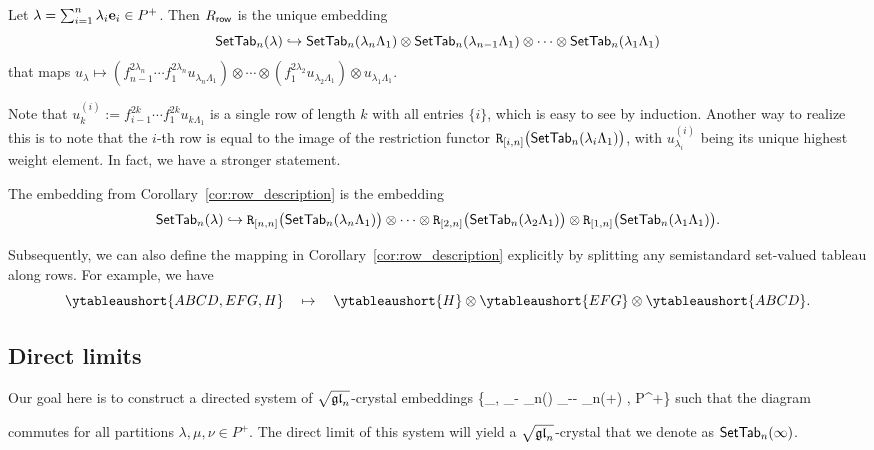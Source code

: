 \documentclass[11pt]{article}
\begin{document}
\begin{corollary}
\label{cor:row_description}
Let $\lambda =\sum_{i=1}^n \lambda_i\textbf{e}_i \in P^+$.
Then $R_{\mathsf{row}} $ is the unique embedding
\[
\mathsf{SetTab}_n(\lambda) \hookrightarrow \mathsf{SetTab}_n(\lambda_n \Lambda_1) \otimes \mathsf{SetTab}_n(\lambda_{n-1} \Lambda_1) \otimes \cdots \otimes \mathsf{SetTab}_n(\lambda_1 \Lambda_1)
\]
that maps
$
u_{\lambda} \mapsto (f_{n-1}^{2\lambda_n} \cdots f_1^{2\lambda_n} u_{\lambda_n \Lambda_1}) \otimes \cdots \otimes (f_1^{2\lambda_2} u_{\lambda_2 \Lambda_1}) \otimes u_{\lambda_1 \Lambda_1}.
$
\end{corollary}

Note that $u_k^{(i)} := f_{i-1}^{2k} \cdots f_1^{2k} u_{k\Lambda_1}$ is a single row of length $k$ with all entries $\{i\}$, which is easy to see by induction.
Another way to realize this is to note that the $i$-th row is equal to the image of the restriction functor $\mathtt{R}_{[i,n]}\bigl(\mathsf{SetTab}_n(\lambda_i \Lambda_1)\bigr)$, with $u_{\lambda_i}^{(i)}$ being its unique highest weight element.
In fact, we have a stronger statement.

\begin{corollary}
\label{cor:row_restriction}
The embedding from Corollary~\ref{cor:row_description} is the embedding
\[
\mathsf{SetTab}_n(\lambda) \hookrightarrow \mathtt{R}_{[n,n]}\bigl( \mathsf{SetTab}_n(\lambda_n \Lambda_1) \bigr) \otimes \cdots \otimes \mathtt{R}_{[2,n]}\bigl( \mathsf{SetTab}_n(\lambda_2 \Lambda_1) \bigr) \otimes \mathtt{R}_{[1,n]}\bigl( \mathsf{SetTab}_n(\lambda_1 \Lambda_1) \bigr).
\]
\end{corollary}

Subsequently, we can also define the mapping in Corollary~\ref{cor:row_description} explicitly by splitting any semistandard set-valued tableau along rows.
For example, we have
\[
\ytableaushort{ABCD,EFG,H}
\quad \mapsto \quad
\ytableaushort{H} \otimes \ytableaushort{EFG} \otimes \ytableaushort{ABCD}.
\]




\subsection{Direct limits}

Our goal here is to construct a {directed system} of $\sqrt{\mathfrak{gl}_n}$-crystal embeddings
\be\label{Psi-eq}
\{\Psi_{\lambda,\mu} \colon \cT_{-\lambda} \otimes \SetTab_n(\lambda) \hookrightarrow \cT_{-\lambda-\mu} \otimes \SetTab_n(\lambda+\mu) \mid \mu, \lambda \in P^+\}
\ee
such that the diagram
\be
\label{eq:directed_system_diagram}
\ee
commutes for all partitions $\lambda,\mu,\nu \in P^+$.
The direct limit of this system will yield a  $\sqrt{\mathfrak{gl}_n}$-crystal
that we denote as $\mathsf{SetTab}_n(\infty)$.
\end{document}
